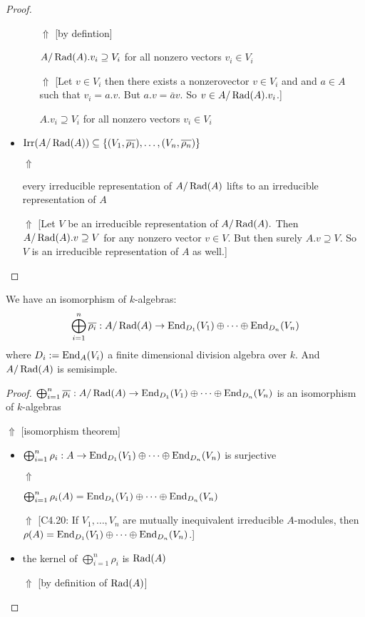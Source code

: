 \begin{proof}
\begin{itemize}
\begin{itemize}
\(\Uparrow \) [by defintion]

\(A/\operatorname{Rad}(A).v_{i}\supseteq V_{i}\) for all nonzero vectors \(v_{i}\in V_{i}\)

\(\Uparrow \) [Let \(v\in V_{i}\) then there exists a nonzerovector \(v\in V_{i}\) and and \(a\in A\) such that \(v_{i}=a.v\). But $a.v=\bar{a}v$. So $v \in A/\operatorname{Rad}(A).v_{i}$.]

\(A.v_{i}\supseteq V_{i}\) for all nonzero vectors \(v_{i}\in V_{i}\)
\end{itemize}
  \item \(\operatorname{Irr}(A/\operatorname{Rad}(A))\subseteq \{(V_{1},\overline{\rho _{1}}),\ldots ,(V_{n},\overline{\rho _{n}})\}\)

\(\Uparrow \)

every irreducible representation of \(A/\operatorname{Rad}(A)\) lifts to an irreducible representation of \(A\)

\(\Uparrow \)  [Let \(V\) be an irreducible representation of \(A/\operatorname{Rad}(A).\) Then \(A/\operatorname{Rad}(A).v\supseteq V\) for any nonzero vector \(v\in V.\) But then surely \(A.v\supseteq V\). So \(V\) is an irreducible representation of \(A\) as well.]
\end{itemize}

\end{proof}

\begin{prop}
We have an isomorphism of \(k\)-algebras:
\[
\bigoplus_{i=1}^n \overline{\rho _{i}} : A/\operatorname{Rad}(A) \rightarrow  \operatorname{End}_{D_{1}}(V_{1})\oplus \cdots \oplus \operatorname{End}_{D_{n}}(V_{n})
\]
where \(D_{i}:=\operatorname{End}_A(V_{i})\) a finite dimensional division algebra over \(k\).
And \(A/\operatorname{Rad}(A)\) is semisimple.
\end{prop}

\begin{proof}
\(\bigoplus_{i=1}^n \overline{\rho _{i}} : A/\operatorname{Rad}(A) \rightarrow  \operatorname{End}_{D_{1}}(V_{1})\oplus \cdots \oplus \operatorname{End}_{D_{n}}(V_{n})\) is an isomorphism of \(k\)-algebras

\(\Uparrow \)  [isomorphism theorem]

\begin{itemize}
  \item \(\bigoplus_{i=1}^n \rho _{i} : A \rightarrow  \operatorname{End}_{D_{1}}(V_{1})\oplus \cdots \oplus \operatorname{End}_{D_{n}}(V_{n})\) is surjective

\(\Uparrow \)

\(\bigoplus_{i=1}^n \rho _{i}(A)= \operatorname{End}_{D_{1}}(V_{1})\oplus \cdots \oplus \operatorname{End}_{D_{n}}(V_{n})\)

\(\Uparrow \)  [C4.20: If \(V_{1},\ldots ,V_{n}\) are mutually inequivalent irreducible \(A\)-modules, then \(\rho (A)=\operatorname{End}_{D_{1}}(V_{1})\oplus \cdots \oplus \operatorname{End}_{D_{n}}(V_{n})\).]

  \item the kernel of \(\bigoplus_{i=1}^n \rho _{i}\) is \(\operatorname{Rad}(A)\)

\(\Uparrow \) [by definition of \(\operatorname{Rad}(A)\)]
\end{itemize}
\end{proof}

